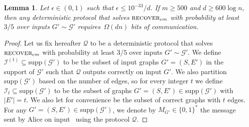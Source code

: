 \documentclass[epsfig,letter,11pt]{article}
\numberwithin{equation}{section}
\newcommand*{\supp}{\mathrm{supp}}
\DeclareMathOperator*{\recover}{\textsc{recover}}
\newcommand{\I}{\mathcal{I}}
\newtheorem{lemma}[theorem]{Lemma}
\begin{document}
\begin{lemma} \label{lem:lb-recover}
	Let $\epsilon \in (0,1)$ such that $\epsilon \le {10^{-33}}/{d}$. If $m\ge 500$ and $d \ge 600 \log n$, then any deterministic protocol that solves $\recover_{\epsilon m}$ with probability at least $3/5$ over inputs $G' \sim \mathcal{G}'$ requires~$\Omega(dn)$ bits of communication.
\end{lemma}
\begin{proof}
	Let us fix hereafter $\mathcal{Q}$ to be a deterministic protocol that solves $\recover_{\epsilon m}$ with probability at least $3/5$ over inputs $G' \sim \mathcal{G}'$. We define $\I^{(1)} \subseteq \supp(\mathcal{G}')$  to be the subset of input graphs $G'=(S,E')$ in the support of $\mathcal{G}'$ such that $\mathcal{Q}$ outputs correctly on input $G'$. We also partition $\supp(\mathcal{G}')$ based on the number of edges, so for every integer $t$ we define $\I_t  \subseteq \supp(\mathcal{G}')$ to be the subset of graphs $G'=(S,E') \in \supp(\mathcal{G}')$ with~$|E'| = t$. We also let for convenience \smash{$\I^{(1)}_t =\I^{(1)}  \cap \I_t$} be the subset of correct graphs with $t$ edges. For any $G'=(S,E') \in \supp(\mathcal{G}')$, we denote by $M_{G'} \in \{0,1\}^*$ the message sent by Alice on input~ using the protocol $\mathcal{Q}$.
		

\end{proof}
\end{document}
